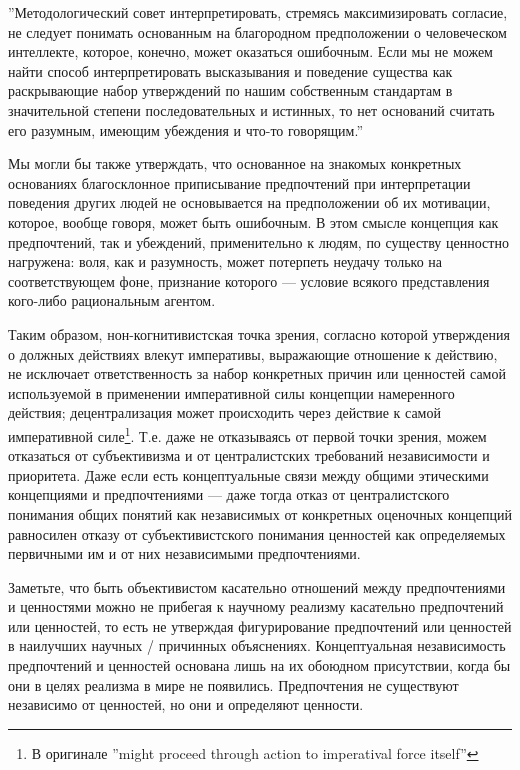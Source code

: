 \documentclass[11pt]{book}
\begin{document}
\smallskip
{}\relax
{}\relax

''Методологический совет интерпретировать, стремясь максимизировать согласие, не следует понимать основанным на благородном предположении о человеческом интеллекте, которое, конечно, может оказаться ошибочным. Если мы не можем найти способ интерпретировать высказывания и поведение существа как раскрывающие набор утверждений по нашим собственным стандартам в значительной степени последовательных и истинных, то нет оснований считать его разумным, имеющим убеждения и что-то говорящим.''

\relax
{}\relax
\smallskip

Мы могли бы также утверждать, что основанное на знакомых конкретных основаниях благосклонное приписывание предпочтений при интерпретации поведения других людей не основывается на предположении об их мотивации, которое, вообще говоря, может быть ошибочным. В этом смысле концепция как предпочтений, так и убеждений, применительно к людям, по существу ценностно нагружена: воля, как и разумность, может потерпеть неудачу только на соответствующем фоне, признание которого --- условие всякого представления кого-либо рациональным агентом.

Таким образом, нон-когнитивистская точка зрения, согласно которой утверждения о должных действиях влекут императивы, выражающие отношение к действию, не исключает ответственность за набор конкретных причин или ценностей самой используемой в применении императивной силы концепции намеренного действия; децентрализация может происходить через действие к самой императивной силе\footnote{В оригинале ''might proceed through action to imperatival force itself''}. Т.е. даже не отказываясь от первой точки зрения, можем отказаться от субъективизма и от централистских требований независимости и приоритета. Даже если есть концептуальные связи между общими этическими концепциями и предпочтениями --- даже тогда отказ от централистского понимания общих понятий как независимых от конкретных оценочных концепций равносилен отказу от субъективистского понимания ценностей как определяемых первичными им и от них независимыми предпочтениями.

Заметьте, что быть объективистом касательно отношений между предпочтениями и ценностями можно не прибегая к научному реализму касательно предпочтений или ценностей, то есть не утверждая фигурирование предпочтений или ценностей в наилучших научных / причинных объяснениях. Концептуальная независимость предпочтений и ценностей основана лишь на их обоюдном присутствии, когда бы они в целях реализма в мире не появились. Предпочтения не существуют независимо от ценностей, но они и определяют ценности.
\end{document}
